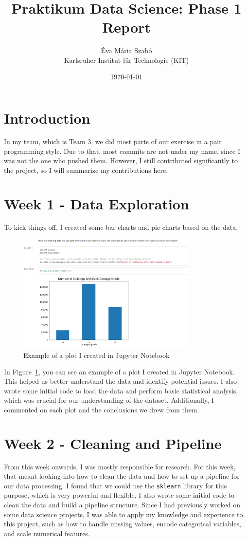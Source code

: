 \documentclass[a4paper,12pt]{article}
\title{Praktikum Data Science: Phase 1 Report}
\author{Éva Mária Szabó \\ \small Karlsruher Institut für Technologie (KIT)}
\date{\today}
\begin{document}
\maketitle
\tableofcontents
\newpage

\section{Introduction}
In my team, which is Team 3, we did most parts of our exercise in a pair programming style. Due to that, most commits are not under my name, since I was not the one who pushed them. However, I still contributed significantly to the project, so I will summarize my contributions here.

\section{Week 1 - Data Exploration}
To kick things off, I created some bar charts and pie charts based on the data.
\begin{figure}[h]
    \centering
    \includegraphics[width=0.8\textwidth]{figures/example_plot_jupyter.png}
    \caption{Example of a plot I created in Jupyter Notebook}
    \label{fig:data_exploration}
\end{figure}
In Figure~\ref{fig:data_exploration}, you can see an example of a plot I created in Jupyter Notebook. This helped us better understand the data and identify potential issues.  
I also wrote some initial code to load the data and perform basic statistical analysis, which was crucial for our understanding of the dataset. Additionally, I commented on each plot and the conclusions we drew from them.

\section{Week 2 - Cleaning and Pipeline}
From this week onwards, I was mostly responsible for research. For this week, that meant looking into how to clean the data and how to set up a pipeline for our data processing. I found that we could use the \texttt{sklearn} library for this purpose, which is very powerful and flexible.  
I also wrote some initial code to clean the data and build a pipeline structure. Since I had previously worked on some data science projects, I was able to apply my knowledge and experience to this project, such as how to handle missing values, encode categorical variables, and scale numerical features.
\end{document}
